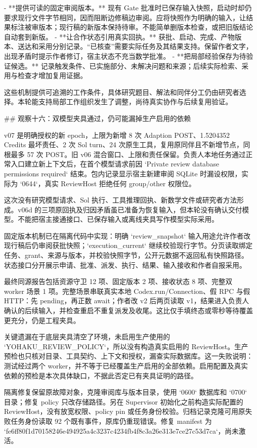- **提供可读的固定审阅版本。** 现有 Gate 批准时已保存输入快照，启动时却仍要求现行文件字节相同，因而阻断边修稿边审阅。应将快照作为明确的输入，让结果标注被审版本；现行稿的新版本保持待审。不能简单删版本检查，或把旧版结论自动套到新版。
- **让合作状态引用真实回执。** 获批、启动、完成、产物版本、送达和采用分别记录。“已核查”需要实际任务及其结果支持。保留作者文字，出现矛盾时提示作者修订，宿主状态不充当数学批准。
- **把局部经验保存为待验证候选。** 记录触发条件、已实施部分、未解决问题和来源；后续实际检索、采用与检查才增加复用证据。

这些机制提供可追溯的工作条件，具体研究题目、解法和同伴分工仍由研究者选择。本轮能支持局部工作组织发生了调整，尚待真实协作与后续复用验证。

## 观察十六：双模型夹具通过，仍可能漏掉生产启用的依赖

v07 是明确授权的新 epoch，上限为新增 8 次 Adaption POST、1.5204352 Credits 最坏责任、2 次 Sol turn、24 次原生工具，复用原同伴且不新增节点，同根最多 57 次 POST。旧 v06 混合窗口、上限和责任保留。负责人本地任务通过正常入口建立新上下文后，在首个模型请求前因 `Private review database permissions required` 结束。包内记录显示宿主新建审阅 SQLite 时漏设权限，实际为 `0644`，真实 ReviewHost 拒绝任何 group/other 权限位。

这次没有研究模型请求、Sol 执行、工具推理回执、新数学文件或研究者方法形成。v06d 的三项原回执及归因矛盾虽已准备为恢复输入，但本轮没有确认交付模型。不能把宿主接通接口、已保存输入或离线夹具写作模型实际采用。

固定版本机制已在隔离代码中实现：明确 `review_snapshot` 输入用途允许作者改现行稿后仍审阅获批快照；`execution_current` 继续校验现行字节。分页读取绑定任务、grant、来源与版本，并校验快照字节，公开元数据不返回私有快照路径。状态接口分开展示申请、批准、派发、执行、结果、输入接收和作者自报采用。

最终同源报告包括资源守卫 12 项、固定版本 2 项、接收状态 8 项、完整双 worker 场景 1 项。完整场景串联真实本地 Codex.run/Connection、假 RPC 与假 HTTP：先 pending，再正数 await；作者改 v2 后两页读取 v1，结果进入负责人确认的后续输入，并检查重启不重复派发及收尾。这比仅手填终态或零秒等待覆盖更充分，仍是工程夹具。

关键遗漏在于底层夹具清空了环境，未启用生产使用的 `YOHAKU_REVIEW_POLICY`，所以没有构造真实启用的 ReviewHost。生产预检也只核对目录、工具契约、上下文和授权，漏查实际数据库。这一失败说明：测试经过两个 worker，并不等于已经覆盖生产启用的全部依赖。启用配置及真实依赖的预检是本次具体缺口，不据此否定已有夹具证明的路径。

隔离修复保留原故障对象，克隆审阅库与版本目录，使用 `0600` 数据库和 `0700` 目录；修复 policy 只改存储路径。另在 Supervisor 初始化之前构造实际配置的 ReviewHost，没有放宽权限、policy pin 或任务身份校验。归档记录克隆可用原失败任务身份读取 92 个既有事件，原库仍重现错误。修复 manifest 为 `fe6ff80f1d70158246e494925a4c3237c4234fb4f8c3a26e313e7ce27c53d7ca`，尚未激活。

